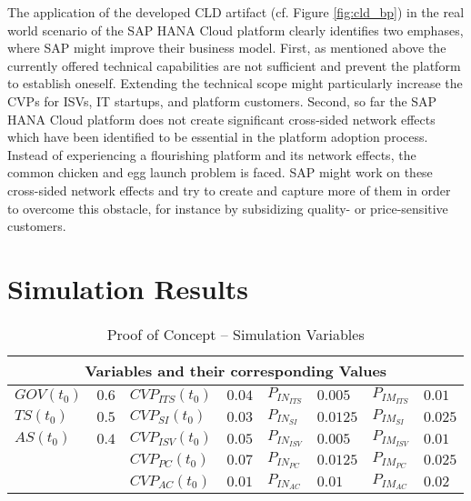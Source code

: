 The application of the developed \ac{CLD} artifact (cf. Figure \ref{fig:cld_bp}) in the real world scenario of the SAP HANA Cloud platform clearly identifies two emphases, where SAP might improve their business model. First, as mentioned above the currently offered technical capabilities are not sufficient and prevent the platform to establish oneself. Extending the technical scope might particularly increase the \acp{CVP} for \acp{ISV}, \ac{IT} startups, and platform customers. Second, so far the SAP HANA Cloud platform does not create significant cross-sided network effects which have been identified to be essential in the platform adoption process. Instead of experiencing a flourishing platform and its network effects, the common chicken and egg launch problem is faced. SAP might work on these cross-sided network effects and try to create and capture more of them in order to overcome this obstacle, for instance by subsidizing quality- or price-sensitive customers.

\section{Simulation Results}\label{ch:poc:sr}



\begin{table}[t]
	\centering
	\begin{tabular}{llllllll}
		\toprule 
		\multicolumn{8}{c}{\footnotesize \textbf{Variables and their corresponding Values}} \\ \midrule
		\footnotesize $GOV(t_0)$ & \footnotesize $0.6$ & \footnotesize $CVP_{ITS}(t_0)$ & \footnotesize $0.04$ & \footnotesize $P_{IN_{ITS}}$ & \footnotesize $0.005$ & \footnotesize $P_{IM_{ITS}}$ & \footnotesize $0.01$ \\
		\footnotesize $TS(t_0)$ & \footnotesize $0.5$ & \footnotesize $CVP_{SI}(t_0)$ & \footnotesize $0.03$ & \footnotesize $P_{IN_{SI}}$ & \footnotesize $0.0125$ & \footnotesize $P_{IM_{SI}}$ & \footnotesize $0.025$ \\
		\footnotesize $AS(t_0)$ & \footnotesize $0.4$ & \footnotesize $CVP_{ISV}(t_0)$ & \footnotesize $0.05$ & \footnotesize $P_{IN_{ISV}}$ & \footnotesize $0.005$ & \footnotesize $P_{IM_{ISV}}$ & \footnotesize $0.01$ \\
		& & \footnotesize $CVP_{PC}(t_0)$ & \footnotesize $0.07$ & \footnotesize $P_{IN_{PC}}$ & \footnotesize $0.0125$ & \footnotesize $P_{IM_{PC}}$ & \footnotesize $0.025$ \\
		& & \footnotesize $CVP_{AC}(t_0)$ & \footnotesize $0.01$ & \footnotesize $P_{IN_{AC}}$ & \footnotesize $0.01$ & \footnotesize $P_{IM_{AC}}$ & \footnotesize $0.02$ \\ \bottomrule
	\end{tabular}
	\caption{Proof of Concept -- Simulation Variables}
	\label{tab:mvar:sap}
\end{table}




